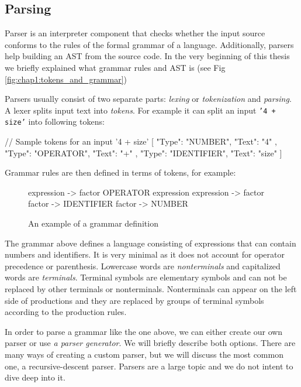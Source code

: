 \subsection{Parsing}
Parser is an interpreter component that checks whether the input source conforms to the rules of the formal grammar of a language. Additionally, parsers help
building an AST from the source code. In the very beginning of this thesis we briefly explained what grammar rules and AST is (see Fig \ref{fig:chap1:tokens_and_grammar})

Parsers usually consist of two separate parts: \emph{lexing} or \emph{tokenization} and \emph{parsing}. A lexer splits input text into \emph{tokens}.
For example it can split an input \texttt{'4 + size'} into following tokens:
\begin{code}
// Sample tokens for an input '4 + size'
[{ "Type": "NUMBER", "Text": "4" },
 { "Type": "OPERATOR", "Text": "+" },
 { "Type": "IDENTIFIER", "Text": "size" }]
\end{code}

Grammar rules are then defined in terms of tokens, for example:
\begin{figure}[!hbt]
\begin{code}
expression -> factor OPERATOR expression
expression -> factor
factor -> IDENTIFIER
factor -> NUMBER
\end{code}
    \caption{An example of a grammar definition}
    \label{fig:chap4:grammar}
\end{figure}

The grammar above defines a language consisting of expressions that can contain numbers and identifiers. It is very minimal as it does not account
for operator precedence or parenthesis. Lowercase words are \emph{nonterminals} and capitalized words are \emph{terminals}. Terminal symbols are elementary
symbols and can not be replaced by other terminals or nonterminals. Nonterminals can appear on the left side of productions and they are replaced by groups
of terminal symbols according to the production rules.

In order to parse a grammar like the one above, we can either create our own parser or use \emph{a parser generator}. We will briefly describe both options.
There are many ways of creating a custom parser, but we will discuss the most common one, a recursive-descent parser. Parsers are a large topic and
we do not intent to dive deep into it.

